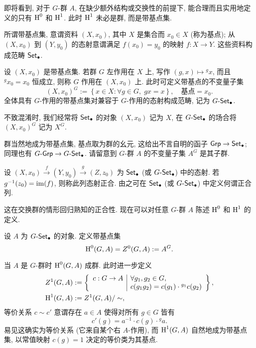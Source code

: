 即将看到, 对于 $G$-群 $A$, 在缺少额外结构或交换性的前提下, 能合理而且实用地定义的只有 $\operatorname{H}^0$ 和 $\operatorname{H}^1$. 此时 $\operatorname{H}^1$ 未必是群, 而是带基点集.

\begin{definition}\label{def:pointed-set}
	所谓带基点集, 意谓资料 $(X, x_0)$, 其中 $X$ 是集合而 $x_0 \in X$ (称为基点); 从 $(X, x_0)$ 到 $(Y, y_0)$ 的态射意谓满足 $f(x_0) = y_0$ 的映射 $f: X \to Y$. 这些资料构成范畴 $\mathsf{Set}_\bullet$.
	
	设 $(X, x_0)$ 是带基点集. 若群 $G$ 左作用在 $X$ 上, 写作 $(g, x) \mapsto {}^g x$, 而且 ${}^g x_0 = x_0$ 恒成立, 则称 $G$ 作用在 $(X, x_0)$ 上. 此时可定义带基点的不变量子集
	\[ (X, x_0)^G := \left\{ x \in X: \forall g \in G, \; gx = x \right\}, \quad \text{基点} = x_0. \]
	全体具有 $G$-作用的带基点集对兼容于 $G$-作用的态射构成范畴, 记为 $G\text{-}\mathsf{Set}_\bullet$.
\end{definition}

不致混淆时, 我们经常将 $\mathsf{Set}_\bullet$ 的对象 $(X, x_0)$ 记为 $X$, 在 $G\text{-}\mathsf{Set}_\bullet$ 的场合将 $(X, x_0)^G$ 记为 $X^G$.

群当然地成为带基点集, 基点取为群的幺元, 这给出不言自明的函子 $\mathsf{Grp} \to \mathsf{Set}_\bullet$; 同理也有 $G\text{-}\mathsf{Grp} \to G\text{-}\mathsf{Set}_\bullet$. 请留意到 $G$-群 $A$ 的不变量子集 $A^G$ 是其子群.

\begin{definition}\label{def:pointed-exact}
	设 $(X, x_0) \xrightarrow{f} (Y, y_0) \xrightarrow{g} (Z, z_0)$ 为 $\mathsf{Set}_\bullet$ (或 $G\text{-}\mathsf{Set}_\bullet$) 中的态射. 若 $g^{-1}(z_0) = \operatorname{im}(f)$, 则称此列态射正合. 由之可在 $\mathsf{Set}_\bullet$ (或 $G\text{-}\mathsf{Set}_\bullet$) 中定义何谓正合列.
\end{definition}

这在交换群的情形回归熟知的正合性. 现在可以对任意 $G$-群 $A$ 陈述 $\operatorname{H}^0$ 和 $\operatorname{H}^1$ 的定义.

\begin{definition}\label{def:nonabelian-H}
	设 $A$ 为 $G\text{-}\mathsf{Set}_\bullet$ 的对象. 定义带基点集
	\[ \operatorname{H}^0(G, A) = Z^0(G, A) := A^G. \]
	
	当 $A$ 是 $G$-群时 $\operatorname{H}^0(G, A)$ 成群. 此时进一步定义
	\begin{align*}
		Z^1(G, A) & := \left\{\begin{array}{r|l}
			c: G \to A & \forall g_1, g_2 \in G, \\
			& c(g_1 g_2) = c(g_1) \cdot {}^{g_1} c(g_2)
		\end{array}\right\}, \\
		\operatorname{H}^1(G, A) & := Z^1(G, A) / \sim ,
	\end{align*}
	等价关系 $c \sim c'$ 意谓存在 $a \in A$ 使得对所有 $g \in G$ 皆有
	\[ c'(g) = a^{-1} \cdot c(g) \cdot {}^g a . \]
	易见这确实为等价关系 (它来自某个右 $A$-作用), 而 $\operatorname{H}^1(G, A)$ 自然地成为带基点集, 以常值映射 $c(g) = 1$ 决定的等价类为其基点.
\end{definition}

